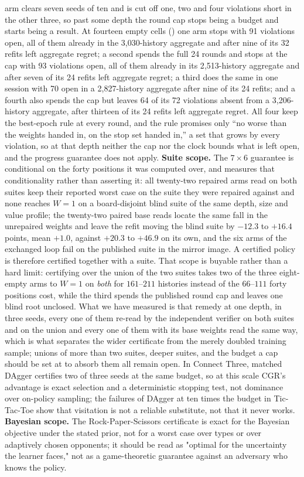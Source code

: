 \documentclass[conference]{IEEEtran}
\begin{document}
arm clears seven seeds of ten and is cut off one, two and four violations short in the other three, so past some depth the round cap stops being a budget and starts being a result. At fourteen empty cells () one arm stops with 91 violations open, all of them already in the 3{,}030-history aggregate and after nine of its 32 refits left aggregate regret; a second spends the full 24 rounds and stops at the cap with 93 violations open, all of them already in its 2{,}513-history aggregate and after seven of its 24 refits left aggregate regret; a third does the same in one session with 70 open in a 2{,}827-history aggregate after nine of its 24 refits; and a fourth also spends the cap but leaves 64 of its 72 violations absent from a 3{,}206-history aggregate, after thirteen of its 24 refits left aggregate regret. All four keep the best-epoch rule at every round, and the rule promises only ``no worse than the weights handed in, on the stop set handed in,'' a set that grows by every violation, so at that depth neither the cap nor the clock bounds what is left open, and the progress guarantee does not apply. \textbf{Suite scope.} The $7\times6$ guarantee is conditional on the forty positions it was computed over, and  measures that conditionality rather than asserting it: all twenty-two repaired arms read on both suites keep their reported worst case on the suite they were repaired against and none reaches $W=1$ on a board-disjoint blind suite of the same depth, size and value profile; the twenty-two paired base reads locate the same fall in the unrepaired weights and leave the refit moving the blind suite by $-12.3$ to $+16.4$ points, mean $+1.0$, against $+20.3$ to $+46.9$ on its own, and the six arms of the exchanged loop fail on the published suite in the mirror image. A certified policy is therefore certified together with a suite. That scope is buyable rather than a hard limit: certifying over the union of the two suites takes two of the three eight-empty arms to $W=1$ on \emph{both} for $161$--$211$ histories instead of the $66$--$111$ forty positions cost, while the third spends the published round cap and leaves one blind root unclosed. What we have measured is that remedy at one depth, in three seeds, every one of them re-read by the independent verifier on both suites and on the union and every one of them with its base weights read the same way, which is what separates the wider certificate from the merely doubled training sample; unions of more than two suites, deeper suites, and the budget a cap should be set at to absorb them all remain open. In Connect Three, matched DAgger certifies two of three seeds at the same budget, so at this scale CGR's advantage is exact selection and a deterministic stopping test, not dominance over on-policy sampling; the failures of DAgger at ten times the budget in Tic-Tac-Toe show that visitation is not a reliable substitute, not that it never works. \textbf{Bayesian scope.} The Rock-Paper-Scissors certificate is exact for the Bayesian objective under the stated prior, not for a worst case over types or over adaptively chosen opponents; it should be read as "optimal for the uncertainty the learner faces," not as a game-theoretic guarantee against an adversary who knows the policy.
\end{document}
